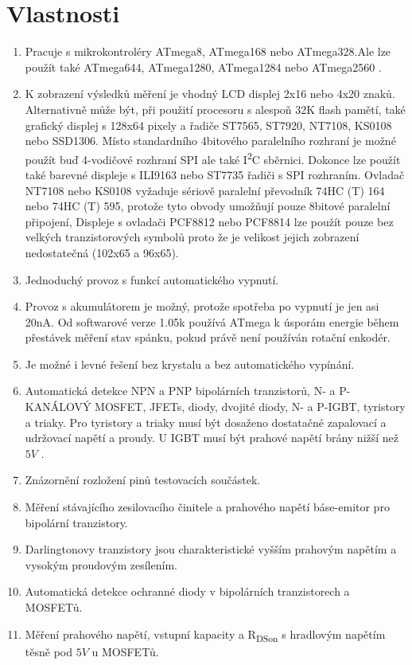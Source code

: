 \chapter{Vlastnosti}
\label{sec:features}
\begin{enumerate}
\item Pracuje s mikrokontroléry ATmega8, ATmega168 nebo ATmega328.Ale lze použít také ATmega644, ATmega1280, ATmega1284 nebo ATmega2560 .
\item K zobrazení výsledků měření je vhodný LCD displej 2x16 nebo 4x20 znaků.
 Alternativně může být, při použití procesoru s alespoň 32K flash pamětí, také grafický displej
 s 128x64 pixely a řadiče ST7565, ST7920, NT7108, KS0108 nebo SSD1306.
 Místo standardního 4bitového paralelního rozhraní je možné použít buď 4-vodičové rozhraní SPI ale také I\textsuperscript{2}C sběrnici.
 Dokonce lze použít také barevné displeje s ILI9163 nebo ST7735 řadiči s SPI rozhraním.
 Ovladač NT7108 nebo KS0108 vyžaduje sériově paralelní převodník 74HC (T) 164 nebo 74HC (T) 595,
 protože tyto obvody umožňují pouze 8bitové paralelní připojení,
 Displeje s ovladači PCF8812 nebo PCF8814 lze použít pouze bez velkých tranzistorových symbolů
 proto že je velikost jejich zobrazení nedostatečná (102x65 a 96x65).
\item Jednoduchý provoz s funkcí automatického vypnutí.
\item Provoz s akumulátorem je možný, protože spotřeba po vypnutí je jen asi 20nA.
Od softwarové verze 1.05k používá ATmega k úsporám energie během přestávek měření stav spánku, pokud právě není používán rotační enkodér.
\item Je možné i levné řešení bez krystalu a bez automatického vypínání.
\item Automatická detekce NPN a PNP bipolárních tranzistorů, N- a P-KANÁLOVÝ MOSFET, JFETs, diody, dvojité diody, N- a P-IGBT, tyristory a triaky.
Pro tyristory a triaky musí být dosaženo dostatačné zapalovací a udržovací napětí a proudy.
U IGBT musí být prahové napětí brány nižší než  \(5V\) .
\item Znázornění rozložení pinů testovacích součástek.
\item Měření stávajícího zesilovacího činitele a prahového napětí báse-emitor pro bipolární tranzistory.
\item Darlingtonovy tranzistory jsou charakteristické vyšším prahovým napětím a vysokým proudovým zesílením.
\item Automatická detekce ochranné diody v bipolárních tranzistorech a MOSFETů.
\item Měření prahového napětí, vstupní kapacity a R\textsubscript{DSon} s hradlovým napětím těsně pod \(5V\) u MOSFETů.

\end{enumerate}

